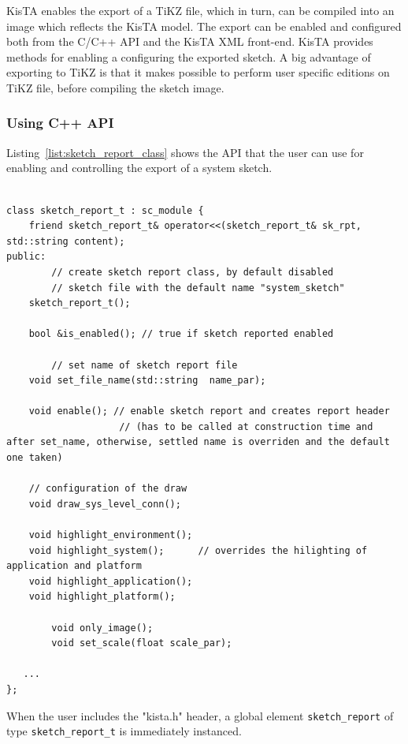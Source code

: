 KisTA enables the export of a TiKZ file, which in turn, can be compiled into an image
which reflects the KisTA model.
%
The export can be enabled and configured both from
the C/C++ API and the KisTA XML front-end.
%
KisTA provides methods for enabling a configuring the exported sketch.
A big advantage of exporting to TiKZ is that it makes possible to perform user specific
editions on TiKZ file, before compiling the sketch image.

\subsubsection{Using C++ API}
\label{sec:sketch_report_cpp_api}

Listing~\ref{list:sketch_report_class} shows the API that the user can use for enabling and controlling the export of a system sketch.

\begin{lstlisting}[style=KistaCodeStyle,caption={API for controling tracing tasks and scheduler activity.},label=list:sketch_report_class]

class sketch_report_t : sc_module {
	friend sketch_report_t& operator<<(sketch_report_t& sk_rpt, std::string content);
public:
		// create sketch report class, by default disabled
		// sketch file with the default name "system_sketch"
	sketch_report_t();
	
	bool &is_enabled(); // true if sketch reported enabled
	
		// set name of sketch report file
	void set_file_name(std::string	name_par); 
	
	void enable(); // enable sketch report and creates report header
	                // (has to be called at construction time and after set_name, otherwise, settled name is overriden and the default one taken)
	
	// configuration of the draw
	void draw_sys_level_conn();
	
	void highlight_environment();
	void highlight_system();      // overrides the hilighting of application and platform
	void highlight_application();
	void highlight_platform();

        void only_image();
        void set_scale(float scale_par);

   ...
};

\end{lstlisting}

When the user includes the "kista.h" header, a global element \texttt{sketch\_report} of type \texttt{sketch\_report\_t}
is immediately instanced.

